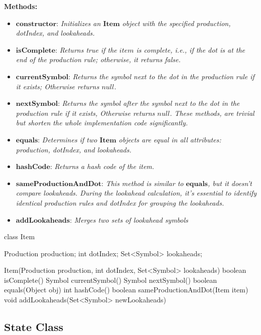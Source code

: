 \textbf{Methods:}
\begin{itemize}
    \item \(\boldsymbol{constructor}\): \textit{Initializes an \(\boldsymbol{Item}\) object with the specified production, dotIndex, and lookaheads.}
    \item \(\boldsymbol{isComplete}\): \textit{Returns true if the \(item\) is complete, i.e., if the dot is at the end of the production rule; otherwise, it returns false.}
    \item \(\boldsymbol{currentSymbol}\): \textit{Returns the symbol next to the dot in the production rule if it exists; Otherwise returns \(null\).}
    \item \(\boldsymbol{nextSymbol}\): \textit{Returns the symbol after the symbol next to the dot in the production rule if it exists, Otherwise returns \(null\). These methods, are trivial but shorten the whole implementation code significantly.}
    \item \(\boldsymbol{equals}\): \textit{Determines if two \(\boldsymbol{Item}\) objects are equal in all attributes: production, dotIndex, and lookaheads.}
    \item \(\boldsymbol{hashCode}\): \textit{Returns a hash code of the item.}
    \item \(\boldsymbol{sameProductionAndDot}\): \textit{This method is similar to \(\boldsymbol{equals}\), but it doesn't compare lookaheads. During the lookahead calculation, it's essential to identify identical production rules and dotIndex for grouping the lookaheads.}
    \item \(\boldsymbol{addLookaheads}\): \textit{Merges two sets of lookahead symbols}
\end{itemize}

\begin{codeblock}
    class Item {
        Production production;
        int dotIndex;
        Set<Symbol> lookaheads;

        Item(Production production, int dotIndex, Set<Symbol> lookaheads) {}
        boolean isComplete() {}
        Symbol currentSymbol() {}
        Symbol nextSymbol(){}
        boolean equals(Object obj) {}
        int hashCode() {}
        boolean sameProductionAndDot(Item item) {}
        void addLookaheads(Set<Symbol> newLookaheads) {}
    }
\end{codeblock}

\vspace{10pt}

\subsection*{\(\boldsymbol{State}\) Class}

